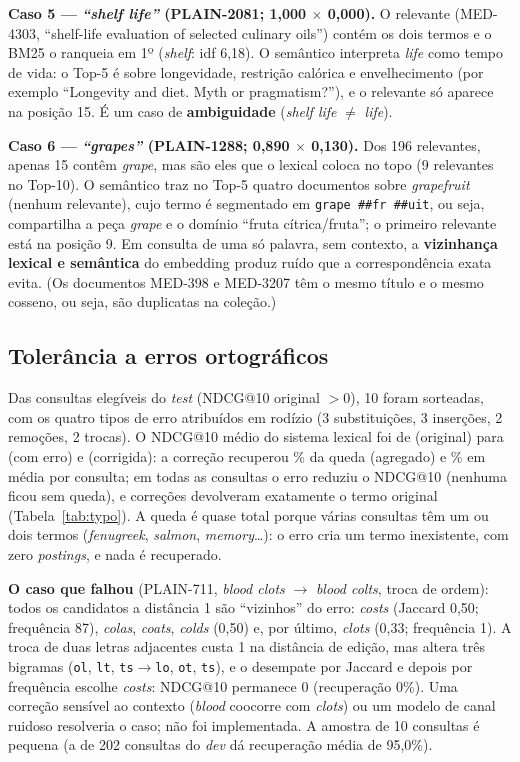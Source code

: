 \textbf{Caso 5 --- \emph{``shelf life''} (PLAIN-2081; 1,000 $\times$ 0,000).} O relevante (MED-4303, ``shelf-life evaluation of selected culinary oils'') contém os dois termos e o BM25 o ranqueia em 1º (\emph{shelf}: idf 6,18). O semântico interpreta \emph{life} como tempo de vida: o Top-5 é sobre longevidade, restrição calórica e envelhecimento (por exemplo ``Longevity and diet. Myth or pragmatism?''), e o relevante só aparece na posição 15. É um caso de \textbf{ambiguidade} (\emph{shelf life} $\ne$ \emph{life}).

\textbf{Caso 6 --- \emph{``grapes''} (PLAIN-1288; 0,890 $\times$ 0,130).} Dos 196 relevantes, apenas 15 contêm \emph{grape}, mas são eles que o lexical coloca no topo (9 relevantes no Top-10). O semântico traz no Top-5 quatro documentos sobre \emph{grapefruit} (nenhum relevante), cujo termo é segmentado em \texttt{grape\,\#\#fr\,\#\#uit}, ou seja, compartilha a peça \emph{grape} e o domínio ``fruta cítrica/fruta''; o primeiro relevante está na posição 9. Em consulta de uma só palavra, sem contexto, a \textbf{vizinhança lexical e semântica} do embedding produz ruído que a correspondência exata evita. (Os documentos MED-398 e MED-3207 têm o mesmo título e o mesmo cosseno, ou seja, são duplicatas na coleção.)

\subsection{Tolerância a erros ortográficos}

Das \TypoEligible{} consultas elegíveis do \emph{test} (NDCG@10 original $>0$), 10 foram sorteadas, com os quatro tipos de erro atribuídos em rodízio (3 substituições, 3 inserções, 2 remoções, 2 trocas). O NDCG@10 médio do sistema lexical foi de \TypoOrig{} (original) para \TypoErr{} (com erro) e \TypoCorr{} (corrigida): a correção recuperou \TypoRecAgg\% da queda (agregado) e \TypoRecMean\% em média por consulta; em todas as \TypoNDrop{} consultas o erro reduziu o NDCG@10 (nenhuma ficou sem queda), e \TypoNExact{} correções devolveram exatamente o termo original (Tabela~\ref{tab:typo}). A queda é quase total porque várias consultas têm um ou dois termos (\emph{fenugreek}, \emph{salmon}, \emph{memory}\ldots): o erro cria um termo inexistente, com zero \emph{postings}, e nada é recuperado.

\textbf{O caso que falhou} (PLAIN-711, \emph{blood clots} $\rightarrow$ \emph{blood colts}, troca de ordem): todos os candidatos a distância 1 são ``vizinhos'' do erro: \emph{costs} (Jaccard 0,50; frequência 87), \emph{colas}, \emph{coats}, \emph{colds} (0,50) e, por último, \emph{clots} (0,33; frequência 1). A troca de duas letras adjacentes custa 1 na distância de edição, mas altera três bigramas (\texttt{ol}, \texttt{lt}, \texttt{ts}$\rightarrow$\texttt{lo}, \texttt{ot}, \texttt{ts}), e o desempate por Jaccard e depois por frequência escolhe \emph{costs}: NDCG@10 permanece 0 (recuperação 0\%). Uma correção sensível ao contexto (\emph{blood} coocorre com \emph{clots}) ou um modelo de canal ruidoso resolveria o caso; não foi implementada. A amostra de 10 consultas é pequena (a de 202 consultas do \emph{dev} dá recuperação média de 95,0\%).

